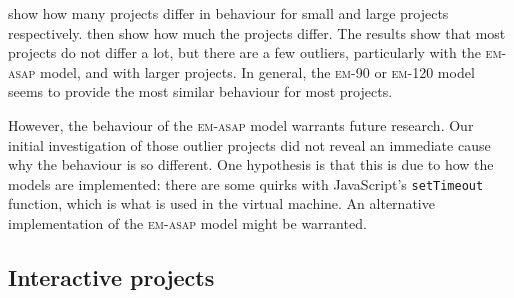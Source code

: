 \documentclass[../main]{subfiles}
\begin{document}
 show how many projects differ in behaviour for small and large projects respectively.
 then show how much the projects differ.
The results show that most projects do not differ a lot, but there are a few outliers, particularly with the \textsc{em-asap} model, and with larger projects.
In general, the \textsc{em-90} or \textsc{em-120} model seems to provide the most similar behaviour for most projects.

However, the behaviour of the \textsc{em-asap} model warrants future research.
Our initial investigation of those outlier projects did not reveal an immediate cause why the behaviour is so different.
One hypothesis is that this is due to how the models are implemented: there are some quirks with JavaScript's \texttt{setTimeout} function, which is what is used in the virtual machine.
An alternative implementation of the \textsc{em-asap} model might be warranted.

\subsection{Interactive projects}\label{subsec:interactive-projects}
\end{document}
